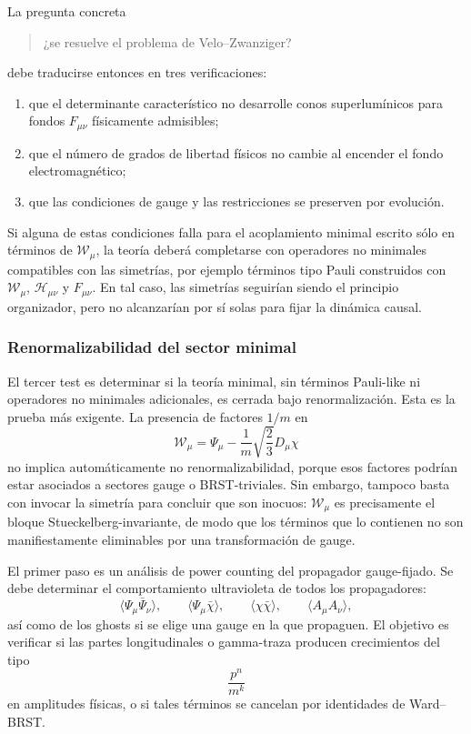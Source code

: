 \documentclass[11pt,a4paper]{article}
\numberwithin{equation}{section}
\newcommand{\Wcal}{\mathcal W}
\newcommand{\Hcal}{\mathcal H}
\begin{document}
La pregunta concreta
\begin{quote}
¿se resuelve el problema de Velo--Zwanziger?
\end{quote}
debe traducirse entonces en tres verificaciones:
\begin{enumerate}[label=(\roman*)]
\item que el determinante característico no desarrolle conos superlumínicos para fondos
      $F_{\mu\nu}$ físicamente admisibles;
\item que el número de grados de libertad físicos no cambie al encender el fondo
      electromagnético;
\item que las condiciones de gauge y las restricciones se preserven por evolución.
\end{enumerate}

Si alguna de estas condiciones falla para el acoplamiento minimal escrito sólo en términos
de $\Wcal_\mu$, la teoría deberá completarse con operadores no minimales compatibles
con las simetrías, por ejemplo términos tipo Pauli construidos con $\Wcal_\mu$,
$\Hcal_{\mu\nu}$ y $F_{\mu\nu}$. En tal caso, las simetrías seguirían siendo el principio
organizador, pero no alcanzarían por sí solas para fijar la dinámica causal.

\subsubsection{Renormalizabilidad del sector minimal}
\label{subsubsec:renormalizabilidad-del-sector-minimal}

El tercer test es determinar si la teoría minimal, sin términos Pauli-like ni operadores
no minimales adicionales, es cerrada bajo renormalización. Esta es la prueba más exigente.
La presencia de factores $1/m$ en
\begin{equation}
  \Wcal_\mu=
  \Psi_\mu-\frac1m\sqrt{\frac23}D_\mu\chi
\end{equation}
no implica automáticamente no renormalizabilidad, porque esos factores podrían estar
asociados a sectores gauge o BRST-triviales. Sin embargo, tampoco basta con invocar la
simetría para concluir que son inocuos: $\Wcal_\mu$ es precisamente el bloque
Stueckelberg-invariante, de modo que los términos que lo contienen no son
manifiestamente eliminables por una transformación de gauge.

El primer paso es un análisis de power counting del propagador gauge-fijado. Se debe
determinar el comportamiento ultravioleta de todos los propagadores:
\begin{equation}
  \langle \Psi_\mu\bar\Psi_\nu\rangle,\qquad
  \langle \Psi_\mu\bar\chi\rangle,\qquad
  \langle \chi\bar\chi\rangle,\qquad
  \langle A_\mu A_\nu\rangle,
\end{equation}
así como de los ghosts si se elige una gauge en la que propaguen. El objetivo es verificar
si las partes longitudinales o gamma-traza producen crecimientos del tipo
\begin{equation}
  \frac{p^n}{m^k}
\end{equation}
en amplitudes físicas, o si tales términos se cancelan por identidades de Ward--BRST.
\end{document}
